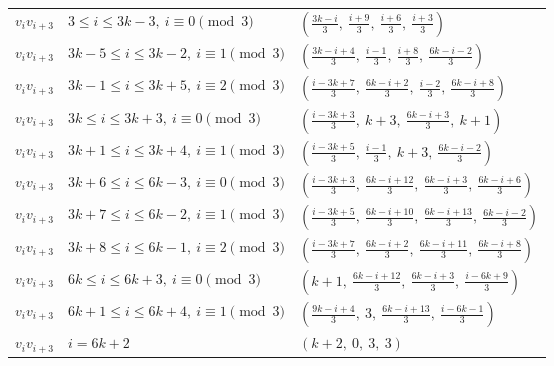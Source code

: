 \begin{longtable}{lll}
$v_i v_{i+3}$ & $3 \le i \le 3k-3,\ i \equiv 0 \pmod{3}$ & $(\frac{3k-i}{3},\ \frac{i+9}{3},\ \frac{i+6}{3},\ \frac{i+3}{3})$ \\
$v_i v_{i+3}$ & $3k-5 \le i \le 3k-2,\ i \equiv 1 \pmod{3}$ & $(\frac{3k-i+4}{3},\ \frac{i-1}{3},\ \frac{i+8}{3},\ \frac{6k-i-2}{3})$ \\
$v_i v_{i+3}$ & $3k-1 \le i \le 3k+5,\ i \equiv 2 \pmod{3}$ & $(\frac{i-3k+7}{3},\ \frac{6k-i+2}{3},\ \frac{i-2}{3},\ \frac{6k-i+8}{3})$ \\
$v_i v_{i+3}$ & $3k \le i \le 3k+3,\ i \equiv 0 \pmod{3}$ & $(\frac{i-3k+3}{3},\ k+3,\ \frac{6k-i+3}{3},\ k+1)$ \\
$v_i v_{i+3}$ & $3k+1 \le i \le 3k+4,\ i \equiv 1 \pmod{3}$ & $(\frac{i-3k+5}{3},\ \frac{i-1}{3},\ k+3,\ \frac{6k-i-2}{3})$ \\
$v_i v_{i+3}$ & $3k+6 \le i \le 6k-3,\ i \equiv 0 \pmod{3}$ & $(\frac{i-3k+3}{3},\ \frac{6k-i+12}{3},\ \frac{6k-i+3}{3},\ \frac{6k-i+6}{3})$ \\
$v_i v_{i+3}$ & $3k+7 \le i \le 6k-2,\ i \equiv 1 \pmod{3}$ & $(\frac{i-3k+5}{3},\ \frac{6k-i+10}{3},\ \frac{6k-i+13}{3},\ \frac{6k-i-2}{3})$ \\
$v_i v_{i+3}$ & $3k+8 \le i \le 6k-1,\ i \equiv 2 \pmod{3}$ & $(\frac{i-3k+7}{3},\ \frac{6k-i+2}{3},\ \frac{6k-i+11}{3},\ \frac{6k-i+8}{3})$ \\
$v_i v_{i+3}$ & $6k \le i \le 6k+3,\ i \equiv 0 \pmod{3}$ & $(k+1,\ \frac{6k-i+12}{3},\ \frac{6k-i+3}{3},\ \frac{i-6k+9}{3})$ \\
$v_i v_{i+3}$ & $6k+1 \le i \le 6k+4,\ i \equiv 1 \pmod{3}$ & $(\frac{9k-i+4}{3},\ 3,\ \frac{6k-i+13}{3},\ \frac{i-6k-1}{3})$ \\
$v_i v_{i+3}$ & $i = 6k+2$ & $(k+2,\ 0,\ 3,\ 3)$ \\
\hline
\end{longtable}
\clearpage
